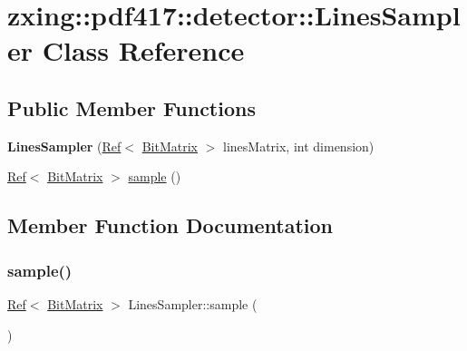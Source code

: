 \hypertarget{classzxing_1_1pdf417_1_1detector_1_1_lines_sampler}{}\section{zxing\+:\+:pdf417\+:\+:detector\+:\+:Lines\+Sampler Class Reference}
\label{classzxing_1_1pdf417_1_1detector_1_1_lines_sampler}
\subsection*{Public Member Functions}
\begin{DoxyCompactItemize}
\item 
\mbox{\label{classzxing_1_1pdf417_1_1detector_1_1_lines_sampler_a15636b7f2c34aff374ee023046ba2f3d}} 
{\bfseries Lines\+Sampler} (\mbox{\hyperlink{classzxing_1_1_ref}{Ref}}$<$ \mbox{\hyperlink{classzxing_1_1_bit_matrix}{Bit\+Matrix}} $>$ lines\+Matrix, int dimension)
\item 
\mbox{\hyperlink{classzxing_1_1_ref}{Ref}}$<$ \mbox{\hyperlink{classzxing_1_1_bit_matrix}{Bit\+Matrix}} $>$ \mbox{\hyperlink{classzxing_1_1pdf417_1_1detector_1_1_lines_sampler_a969a26593173878852019f5a15f876a8}{sample}} ()
\end{DoxyCompactItemize}


\subsection{Member Function Documentation}
\mbox{\label{classzxing_1_1pdf417_1_1detector_1_1_lines_sampler_a969a26593173878852019f5a15f876a8}} 
\subsubsection{\texorpdfstring{sample()}{sample()}}
{\footnotesize\ttfamily \mbox{\hyperlink{classzxing_1_1_ref}{Ref}}$<$ \mbox{\hyperlink{classzxing_1_1_bit_matrix}{Bit\+Matrix}} $>$ Lines\+Sampler\+::sample (\begin{DoxyParamCaption}{ }\end{DoxyParamCaption})}

